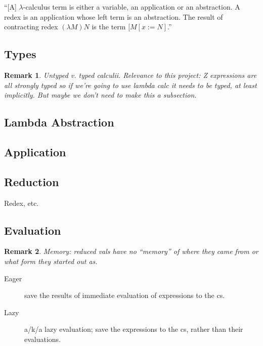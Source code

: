 \documentclass[12pt]{tufte-handout}
\numberwithin{equation}{subsection}
\numberwithin{equation}{subsection}
\newtheorem{remark}{Remark}
\begin{document}
``[A] \(\lambda\)-calculus term is either a variable, an application
or an abstraction.  A redex is an application whose left term is an
abstraction.  The result of contracting redex \((\lambda M) N\) is the
term \([M[x:=N]\).''

  \subsection{Types}
  \label{subs:lambdatypes}

  \begin{remark}
    Untyped v. typed calculii.  Relevance to this project: Z expressions
    are all strongly typed so if we're going to use lambda calc it needs
    to be typed, at least implicitly.  But maybe we don't need to make
    this a subsection.
  \end{remark}

  \subsection{Lambda Abstraction}
  \label{subs:lambda}

  \subsection{Application}
  \label{subs:applic}

  \subsection{Reduction}
  \label{subs:reduction}

  Redex, etc.

  \subsection{Evaluation}
  \label{subs:evalstrat}

  \begin{remark}
    Memory: reduced vals have no ``memory'' of where they came from or
    what form they started out as.
  \end{remark}

  \begin{description}
  \item [Eager]  save the results of immediate evaluation of expressions to the cs.
  \item [Lazy] a/k/a lazy evaluation; save the expressions to the cs, rather than their evaluations.
  \end{description}
\end{document}

